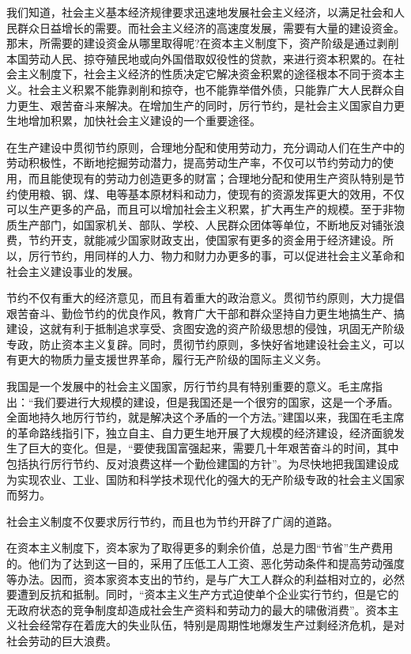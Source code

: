 \documentclass{book}
\begin{document}
我们知道，社会主义基本经济规律要求迅速地发展社会主义经济，以满足社会和人民群众日益增长的需要。而社会主义经济的高速度发展，需要有大量的建设资金。那末，所需要的建设资金从哪里取得呢?在资本主义制度下，资产阶级是通过剥削本国劳动人民、掠夺殖民地或向外国借取奴役性的贷款，来进行资本积累的。在社会主义制度下，社会主义经济的性质决定它解决资金积累的途径根本不同于资本主义。社会主义积累不能靠剥削和掠夺，也不能靠举借外债，只能靠广大人民群众自力更生、艰苦奋斗来解决。在增加生产的同时，厉行节约，是社会主义国家自力更生地增加积累，加快社会主义建设的一个重要途径。

在生产建设中贯彻节约原则，合理地分配和使用劳动力，充分调动人们在生产中的劳动积极性，不断地挖掘劳动潜力，提高劳动生产率，不仅可以节约劳动力的使用，而且能使现有的劳动力创造更多的财富；合理地分配和使用生产资队特别是节约使用粮、钢、煤、电等基本原材料和动力，使现有的资源发挥更大的效用，不仅可以生产更多的产品，而且可以增加社会主义积累，扩大再生产的规模。至于非物质生产部门，如国家机关、部队、学校、人民群众团体等单位，不断地反对铺张浪费，节约开支，就能减少国家财政支出，使国家有更多的资金用于经济建设。所以，厉行节约，用同样的人力、物力和财力办更多的事，可以促进社会主义革命和社会主义建设事业的发展。

节约不仅有重大的经济意见，而且有着重大的政治意义。贯彻节约原则，大力提倡艰苦奋斗、勤俭节约的优良作风，教育广大干部和群众坚持自力更生地搞生产、搞建设，这就有利于抵制追求享受、贪图安逸的资产阶级思想的侵蚀，巩固无产阶级专政，防止资本主义复辟。同时，贯彻节约原则，多快好省地建设社会主义，可以有更大的物质力量支援世界革命，履行无产阶级的国际主义义务。

我国是一个发展中的社会主义国家，厉行节约具有特别重要的意义。毛主席指出：“我们要进行大规模的建设，但是我国还是一个很穷的国家，这是一个矛盾。全面地持久地厉行节约，就是解决这个矛盾的一个方法。”建国以来，我国在毛主席的革命路线指引下，独立自主、自力更生地开展了大规模的经济建设，经济面貌发生了巨大的变化。但是，“要使我国富强起来，需要几十年艰苦奋斗的时间，其中包括执行厉行节约、反对浪费这样一个勤俭建国的方针”。为尽快地把我国建设成为实现农业、工业、国防和科学技术现代化的强大的无产阶级专政的社会主义国家而努力。

社会主义制度不仅要求厉行节约，而且也为节约开辟了广阔的道路。

在资本主义制度下，资本家为了取得更多的剩余价值，总是力图“节省”生产费用的。他们为了达到这一目的，采用了压低工人工资、恶化劳动条件和提高劳动强度等办法。因而，资本家资本支出的节约，是与广大工人群众的利益相对立的，必然要遭到反抗和抵制。同时，“资本主义生产方式迫使单个企业实行节约，但是它的无政府状态的竞争制度却造成社会生产资料和劳动力的最大的啸傲消费”。资本主义社会经常存在着庞大的失业队伍，特别是周期性地爆发生产过剩经济危机，是对社会劳动的巨大浪费。
\end{document}
